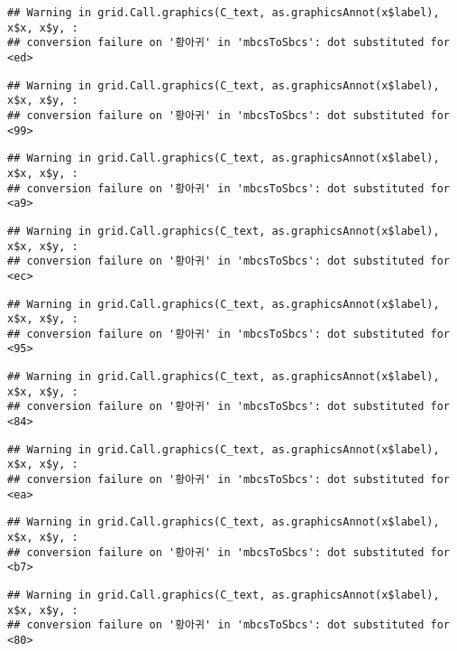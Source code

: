 \documentclass[
]{article}
\begin{document}
\begin{verbatim}
## Warning in grid.Call.graphics(C_text, as.graphicsAnnot(x$label), x$x, x$y, :
## conversion failure on '황아귀' in 'mbcsToSbcs': dot substituted for <ed>
\end{verbatim}

\begin{verbatim}
## Warning in grid.Call.graphics(C_text, as.graphicsAnnot(x$label), x$x, x$y, :
## conversion failure on '황아귀' in 'mbcsToSbcs': dot substituted for <99>
\end{verbatim}

\begin{verbatim}
## Warning in grid.Call.graphics(C_text, as.graphicsAnnot(x$label), x$x, x$y, :
## conversion failure on '황아귀' in 'mbcsToSbcs': dot substituted for <a9>
\end{verbatim}

\begin{verbatim}
## Warning in grid.Call.graphics(C_text, as.graphicsAnnot(x$label), x$x, x$y, :
## conversion failure on '황아귀' in 'mbcsToSbcs': dot substituted for <ec>
\end{verbatim}

\begin{verbatim}
## Warning in grid.Call.graphics(C_text, as.graphicsAnnot(x$label), x$x, x$y, :
## conversion failure on '황아귀' in 'mbcsToSbcs': dot substituted for <95>
\end{verbatim}

\begin{verbatim}
## Warning in grid.Call.graphics(C_text, as.graphicsAnnot(x$label), x$x, x$y, :
## conversion failure on '황아귀' in 'mbcsToSbcs': dot substituted for <84>
\end{verbatim}

\begin{verbatim}
## Warning in grid.Call.graphics(C_text, as.graphicsAnnot(x$label), x$x, x$y, :
## conversion failure on '황아귀' in 'mbcsToSbcs': dot substituted for <ea>
\end{verbatim}

\begin{verbatim}
## Warning in grid.Call.graphics(C_text, as.graphicsAnnot(x$label), x$x, x$y, :
## conversion failure on '황아귀' in 'mbcsToSbcs': dot substituted for <b7>
\end{verbatim}

\begin{verbatim}
## Warning in grid.Call.graphics(C_text, as.graphicsAnnot(x$label), x$x, x$y, :
## conversion failure on '황아귀' in 'mbcsToSbcs': dot substituted for <80>
\end{verbatim}
\end{document}
